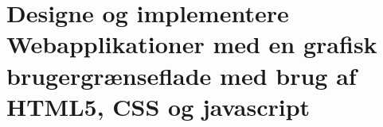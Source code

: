 \section{Designe og implementere Webapplikationer med en grafisk brugergrænseflade med brug af HTML5, CSS og javascript}\label{sec:spm10}

